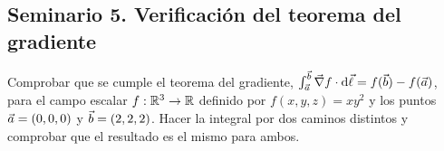 

\subsection{Seminario 5. Verificación del teorema del gradiente}\label{sem:gradiente}
\begin{ejercicio}\label{ejer:verif-gradiente}
Comprobar que se cumple el teorema del gradiente,
$\int_{\vec{a}}^{\vec{b}}\vec{\nabla} f\cdot\mathrm{d}\vec{\ell}=f(\vec{b})-f(\vec{a})$, para el campo escalar
$f:\mathbb{R}^{3}\to\mathbb{R}$ definido por $f(x,y,z)=xy^{2}$ y los puntos
$\vec{a}=(0,0,0)$ y $\vec{b}=(2,2,2)$. Hacer la integral por dos caminos
distintos y comprobar que el resultado es el mismo para ambos.
\end{ejercicio}
